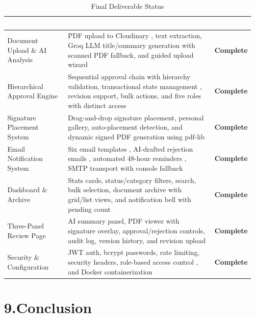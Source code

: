 \documentclass[12pt,a4paper]{report}
\newcommand{\citeref}[1]{%
  \textcolor{citeborder}{%
    \fboxsep=2pt%
    \fcolorbox{citeborder}{citebg}{\footnotesize\bfseries[#1]}%
  }%
}
\begin{document}
\renewcommand{\arraystretch}{1.2}
\begin{table}[H]
\centering
\caption{Final Deliverable Status}
\small
\vspace{0.3cm}
\begin{tabularx}{\textwidth}{|p{3.6cm}|X|>{\centering\arraybackslash}p{2.0cm}|}
\hline
\rowcolor{headerblue}
\textcolor{white}{\textbf{Deliverable}} & \textcolor{white}{\textbf{Description}} & \textcolor{white}{\textbf{Status}} \\
\hline
\rowcolor{rowgray}
Document Upload \& AI Analysis & PDF upload to Cloudinary \citeref{5}, text extraction, Groq LLM \citeref{2} title/summary generation with scanned PDF fallback, and guided upload wizard & \textbf{Complete} \\
\hline
Hierarchical Approval Engine & Sequential approval chain with hierarchy validation, transactional state management \citeref{3}, revision support, bulk actions, and five roles with distinct access & \textbf{Complete} \\
\hline
\rowcolor{rowgray}
Signature Placement System & Drag-and-drop signature placement, personal gallery, auto-placement detection, and dynamic signed PDF generation using pdf-lib \citeref{8} & \textbf{Complete} \\
\hline
Email Notification System & Six email templates \citeref{6}, AI-drafted rejection emails \citeref{2}, automated 48-hour reminders \citeref{7}, SMTP transport with console fallback & \textbf{Complete} \\
\hline
\rowcolor{rowgray}
Dashboard \& Archive & Stats cards, status/category filters, search, bulk selection, document archive with grid/list views, and notification bell with pending count & \textbf{Complete} \\
\hline
Three-Panel Review Page & AI summary panel, PDF viewer with signature overlay, approval/rejection controls, audit log, version history, and revision upload & \textbf{Complete} \\
\hline
\rowcolor{rowgray}
Security \& Configuration & JWT auth, bcrypt passwords, rate limiting, security headers, role-based access control \citeref{4}, and Docker containerization \citeref{9} & \textbf{Complete} \\
\hline
\end{tabularx}
\end{table}

\chapter*{9.\quad Conclusion}
\end{document}
